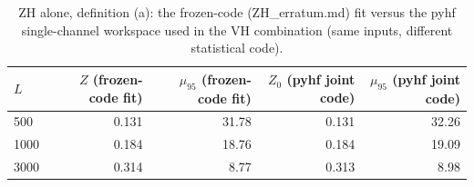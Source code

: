 \begin{table}[ht]\centering\small
\begin{tabular}{lrrrr}\hline
$L$ & $Z$ (frozen-code fit) & $\mu_{95}$ (frozen-code fit) & $Z_0$ (pyhf joint code) & $\mu_{95}$ (pyhf joint code) \\\hline
500 & 0.131 & 31.78 & 0.131 & 32.26 \\
1000 & 0.184 & 18.76 & 0.184 & 19.09 \\
3000 & 0.314 & 8.77 & 0.313 & 8.98 \\\hline
\end{tabular}
\caption{ZH alone, definition (a): the frozen-code (ZH\_erratum.md) fit versus the pyhf single-channel workspace used in the VH combination (same inputs, different statistical code).}
\end{table}

